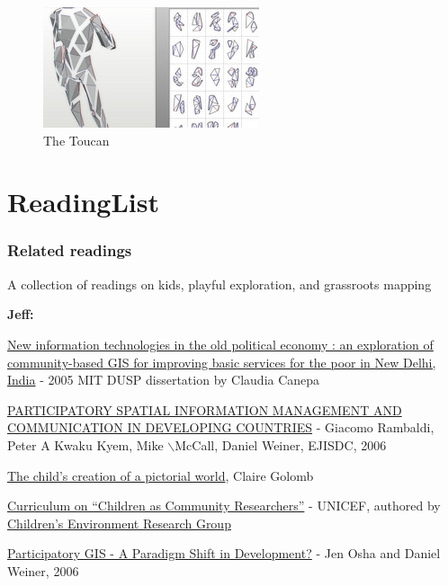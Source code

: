 \documentclass[11pt]{report}
\begin{document}
\begin{figure}[h]
  \begin{center}
    \includegraphics[scale=0.75]{images/test.jpg}
    \caption{The Toucan}
  \end{center}
\end{figure}

\chapter{ReadingList}

\hypertarget{related_readings_1}{}\subsection*{{Related readings}}\label{related_readings_1}

A collection of readings on kids, playful exploration, and grassroots mapping

\textbf{Jeff:}

\href{http://dspace.mit.edu/handle/1721.1/33012}{New information technologies in the old political economy : an exploration of community-based GIS for improving basic services for the poor in New Delhi, India} - 2005 MIT DUSP dissertation by Claudia Canepa

\href{http://www.ejisdc.org/ojs2/index.php/ejisdc/article/viewFile/237/158}{PARTICIPATORY SPATIAL INFORMATION MANAGEMENT AND COMMUNICATION IN DEVELOPING COUNTRIES} - Giacomo Rambaldi, Peter A Kwaku Kyem, Mike $\backslash$McCall, Daniel Weiner, EJISDC, 2006

\href{http://books.google.com/books?id=4u79ffyzekoC&printsec=frontcover&dq=child%27s+pictorial+world&ei=5EUYS9veGqPqygShs7TVBw#v=onepage&q=&f=false}{The child'{}s creation of a pictorial world}, Claire Golomb

\href{http://www.unicef.org/teachers/researchers/intro.htm}{Curriculum on ``{}Children as Community Researchers''{}} - UNICEF, authored by \href{http://web.gc.cuny.edu/che/cerg/about_cerg/environmental_learning_index.htm}{Children'{}s Environment Research Group}

\href{http://www.directionsmag.com/article.php?article_id=2365&trv=1.}{Participatory GIS - A Paradigm Shift in Development?} - Jen Osha and Daniel Weiner, 2006
\end{document}

